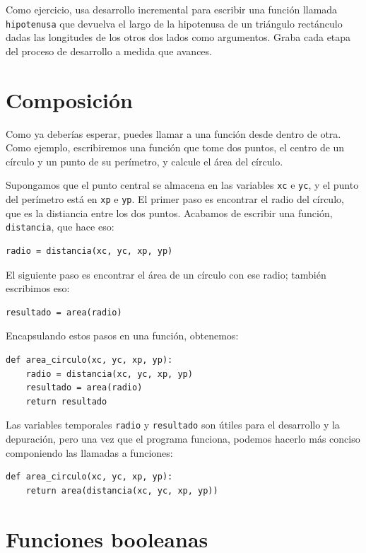 \documentclass[10pt]{book}
\begin{document}
Como ejercicio, usa desarrollo incremental para escribir una función
llamada {\tt hipotenusa} que devuelva el largo de la hipotenusa de un
triángulo rectánculo dadas las longitudes de los otros dos lados como argumentos.
Graba cada etapa del proceso de desarrollo a medida que avances.



\section{Composición}

Como ya deberías esperar, puedes llamar a una función desde dentro de
otra.  Como ejemplo, escribiremos una función que tome dos puntos,
el centro de un círculo y un punto de su perímetro, y calcule
el área del círculo.

Supongamos que el punto central se almacena en las variables {\tt xc} e
{\tt yc}, y el punto del perímetro está en {\tt xp} e {\tt yp}. El
primer paso es encontrar el radio del círculo, que es la distiancia
entre los dos puntos.  Acabamos de escribir una función, {\tt
distancia}, que hace eso:

\begin{verbatim}
radio = distancia(xc, yc, xp, yp)
\end{verbatim}
%
El siguiente paso es encontrar el área de un círculo con ese radio;
también escribimos eso:

\begin{verbatim}
resultado = area(radio)
\end{verbatim}
%
Encapsulando estos pasos en una función, obtenemos:

\begin{verbatim}
def area_circulo(xc, yc, xp, yp):
    radio = distancia(xc, yc, xp, yp)
    resultado = area(radio)
    return resultado
\end{verbatim}
%
Las variables temporales {\tt radio} y {\tt resultado} son útiles para
el desarrollo y la depuración, pero una vez que el programa funciona, podemos
hacerlo más conciso componiendo las llamadas a funciones:

\begin{verbatim}
def area_circulo(xc, yc, xp, yp):
    return area(distancia(xc, yc, xp, yp))
\end{verbatim}
%

\section{Funciones booleanas}
\label{boolean}
\end{document}
